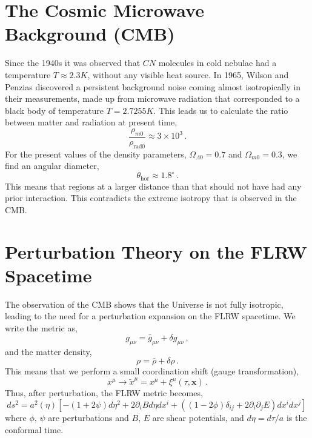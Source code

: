 \documentclass{book}
\begin{document}
	\section{The Cosmic Microwave Background (CMB)}\label{CMB}
	Since the 1940s it was observed that $CN$ molecules in cold nebulae had a temperature $T\approx 2.3K$, without any visible heat source. In 1965, Wilson and Penzias discovered a persistent background noise coming almost isotropically in their measurements, made up from microwave radiation that corresponded to a black body of temperature $T=2.7255K$. This leads us to calculate the ratio between matter and radiation at present time,
	\begin{equation*}
		\frac{\rho_{m0}}{\rho_{\text{rad}0}}\approx 3\times 10^3 \, .
	\end{equation*}
	For the present values of the density parameters, $\Omega_{\Lambda0}=0.7$ and $\Omega_{m0}=0.3$, we find an angular diameter,
	\begin{equation*}
		\theta_\text{hor}\approx 1.8^\circ \, .
	\end{equation*}
	This means that regions at a larger distance than that should not have had any prior interaction. This contradicts the extreme isotropy that is observed in the CMB.
	\section{Perturbation Theory on the FLRW Spacetime}
	The observation of the CMB shows that the Universe is not fully isotropic, leading to the need for a perturbation expansion on the FLRW spacetime. We write the metric as,
	\begin{equation}
		g_{\mu\nu}=\bar g_{\mu\nu}+\delta g_{\mu\nu} \, ,
	\end{equation}
	and the matter density, 
	\begin{equation}
		\rho=\bar \rho+\delta\rho \, .
	\end{equation}
	This means that we perform a small coordination shift (gauge transformation),
	\begin{equation}
		\label{coord_trans}
		x^\mu \to \tilde x ^\mu = x^\mu +\xi^\mu (\tau,\mathbf{x}) \, .
	\end{equation}
	Thus, after perturbation, the FLRW metric becomes,
	\begin{equation}
		\label{perturbed_FLRW}
		ds^2=a^2(\eta)\left[ -(1+2\psi)d\eta^2 + 2\partial_i B d\eta dx^i + \left( (1-2\phi)\delta_{ij}+2\partial_i \partial_j E \right) dx^i dx^j \right]\,
	\end{equation}
	where $\phi, \, \psi$ are perturbations and $B, \, E$ are shear potentials, and $d\eta=d\tau/a$ is the conformal time. 
	
\end{document}
